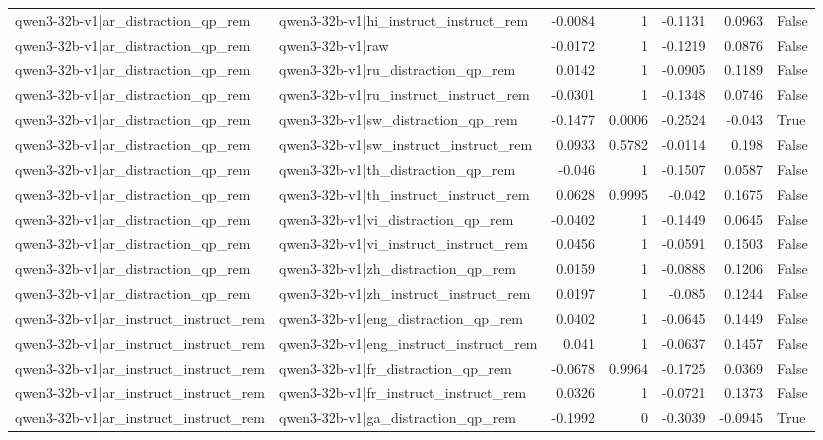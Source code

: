 \begin{table}
\begin{tabular}{l l r r r r l}
qwen3-32b-v1|ar_distraction_qp_rem & qwen3-32b-v1|hi_instruct_instruct_rem & -0.0084 & 1 & -0.1131 & 0.0963 & False \\
qwen3-32b-v1|ar_distraction_qp_rem & qwen3-32b-v1|raw & -0.0172 & 1 & -0.1219 & 0.0876 & False \\
qwen3-32b-v1|ar_distraction_qp_rem & qwen3-32b-v1|ru_distraction_qp_rem & 0.0142 & 1 & -0.0905 & 0.1189 & False \\
qwen3-32b-v1|ar_distraction_qp_rem & qwen3-32b-v1|ru_instruct_instruct_rem & -0.0301 & 1 & -0.1348 & 0.0746 & False \\
qwen3-32b-v1|ar_distraction_qp_rem & qwen3-32b-v1|sw_distraction_qp_rem & -0.1477 & 0.0006 & -0.2524 & -0.043 & True \\
qwen3-32b-v1|ar_distraction_qp_rem & qwen3-32b-v1|sw_instruct_instruct_rem & 0.0933 & 0.5782 & -0.0114 & 0.198 & False \\
qwen3-32b-v1|ar_distraction_qp_rem & qwen3-32b-v1|th_distraction_qp_rem & -0.046 & 1 & -0.1507 & 0.0587 & False \\
qwen3-32b-v1|ar_distraction_qp_rem & qwen3-32b-v1|th_instruct_instruct_rem & 0.0628 & 0.9995 & -0.042 & 0.1675 & False \\
qwen3-32b-v1|ar_distraction_qp_rem & qwen3-32b-v1|vi_distraction_qp_rem & -0.0402 & 1 & -0.1449 & 0.0645 & False \\
qwen3-32b-v1|ar_distraction_qp_rem & qwen3-32b-v1|vi_instruct_instruct_rem & 0.0456 & 1 & -0.0591 & 0.1503 & False \\
qwen3-32b-v1|ar_distraction_qp_rem & qwen3-32b-v1|zh_distraction_qp_rem & 0.0159 & 1 & -0.0888 & 0.1206 & False \\
qwen3-32b-v1|ar_distraction_qp_rem & qwen3-32b-v1|zh_instruct_instruct_rem & 0.0197 & 1 & -0.085 & 0.1244 & False \\
qwen3-32b-v1|ar_instruct_instruct_rem & qwen3-32b-v1|eng_distraction_qp_rem & 0.0402 & 1 & -0.0645 & 0.1449 & False \\
qwen3-32b-v1|ar_instruct_instruct_rem & qwen3-32b-v1|eng_instruct_instruct_rem & 0.041 & 1 & -0.0637 & 0.1457 & False \\
qwen3-32b-v1|ar_instruct_instruct_rem & qwen3-32b-v1|fr_distraction_qp_rem & -0.0678 & 0.9964 & -0.1725 & 0.0369 & False \\
qwen3-32b-v1|ar_instruct_instruct_rem & qwen3-32b-v1|fr_instruct_instruct_rem & 0.0326 & 1 & -0.0721 & 0.1373 & False \\
qwen3-32b-v1|ar_instruct_instruct_rem & qwen3-32b-v1|ga_distraction_qp_rem & -0.1992 & 0 & -0.3039 & -0.0945 & True \\

\end{tabular}
\end{table}
